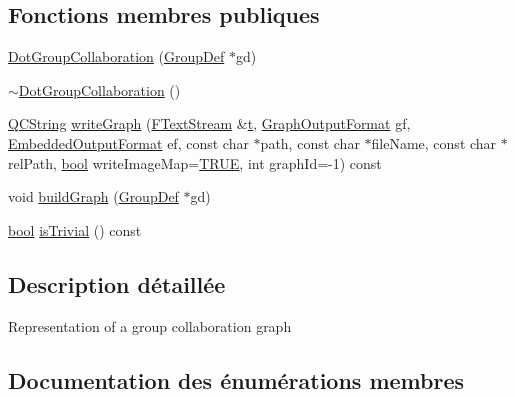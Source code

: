 \subsection*{Fonctions membres publiques}
\begin{DoxyCompactItemize}
\item 
\hyperlink{class_dot_group_collaboration_aa113b5a55446f4ea4aeab03a4b268387}{Dot\+Group\+Collaboration} (\hyperlink{class_group_def}{Group\+Def} $\ast$gd)
\item 
\hyperlink{class_dot_group_collaboration_a12add4fb219d598569440c259239263b}{$\sim$\+Dot\+Group\+Collaboration} ()
\item 
\hyperlink{class_q_c_string}{Q\+C\+String} \hyperlink{class_dot_group_collaboration_a14bfecff982ea50e48733aab60ac184a}{write\+Graph} (\hyperlink{class_f_text_stream}{F\+Text\+Stream} \&\hyperlink{058__bracket__recursion_8tcl_a69e959f6901827e4d8271aeaa5fba0fc}{t}, \hyperlink{dot_8h_ac60ef98d62b78366a17c9f1bda96523f}{Graph\+Output\+Format} gf, \hyperlink{dot_8h_a8680135da08a5ef57cebe20060912dcc}{Embedded\+Output\+Format} ef, const char $\ast$path, const char $\ast$file\+Name, const char $\ast$rel\+Path, \hyperlink{qglobal_8h_a1062901a7428fdd9c7f180f5e01ea056}{bool} write\+Image\+Map=\hyperlink{qglobal_8h_a04a6422a52070f0dc478693da640242b}{T\+R\+U\+E}, int graph\+Id=-\/1) const 
\item 
void \hyperlink{class_dot_group_collaboration_a5d03d883816436706f414dd734013629}{build\+Graph} (\hyperlink{class_group_def}{Group\+Def} $\ast$gd)
\item 
\hyperlink{qglobal_8h_a1062901a7428fdd9c7f180f5e01ea056}{bool} \hyperlink{class_dot_group_collaboration_a303f3f76a7a4ab30f9991d9cbd41ba7a}{is\+Trivial} () const 
\end{DoxyCompactItemize}


\subsection{Description détaillée}
Representation of a group collaboration graph 

\subsection{Documentation des énumérations membres}
\hypertarget{class_dot_group_collaboration_ab83aa11b8617398a50923c04c2541624}{}
